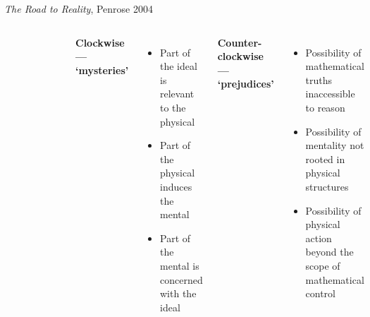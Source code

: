 \documentclass[xcolor=dvipsnames]{beamer}
\begin{document}
\begin{frame}{\emph{The Road to Reality}, Penrose 2004}
  \centering
  \begin{columns}
    \centering
    \begin{figure}
    \centering
    \includegraphics[width=0.99\textwidth]{penrose}
  \end{figure}
    \textbf{Clockwise --- `mysteries'}
    \begin{itemize}
\item Part of the ideal is relevant to the physical
\item Part of the physical induces the mental
\item Part of the mental is concerned with the ideal
    \end{itemize}

\textbf{Counter-clockwise --- `prejudices'}
    \begin{itemize}
\item Possibility of mathematical truths inaccessible to reason
\item Possibility of mentality not rooted in physical structures
\item Possibility of physical action beyond the scope of mathematical control
    \end{itemize}
  \end{columns}
\end{frame}
\end{document}
